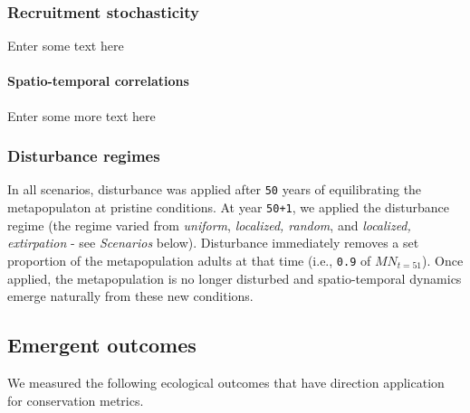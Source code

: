 \documentclass[]{article}
\let\oldparagraph\paragraph
\renewcommand{\paragraph}[1]{\oldparagraph{#1}\mbox{}}
\begin{document}
\hypertarget{recruitment-stochasticity}{%
\subsubsection{Recruitment
stochasticity}\label{recruitment-stochasticity}}

Enter some text here

\hypertarget{spatio-temporal-correlations}{%
\paragraph{Spatio-temporal
correlations}\label{spatio-temporal-correlations}}

Enter some more text here

\hypertarget{disturbance-regimes}{%
\subsubsection{Disturbance regimes}\label{disturbance-regimes}}

In all scenarios, disturbance was applied after \texttt{50} years of
equilibrating the metapopulaton at pristine conditions. At year
\texttt{50+1}, we applied the disturbance regime (the regime varied from
\emph{uniform}, \emph{localized, random}, and \emph{localized,
extirpation} - see \emph{Scenarios} below). Disturbance immediately
removes a set proportion of the metapopulation adults at that time
(i.e., \texttt{0.9} of \(MN_{t=51}\)). Once applied, the metapopulation
is no longer disturbed and spatio-temporal dynamics emerge naturally
from these new conditions.

\hypertarget{emergent-outcomes}{%
\subsection{Emergent outcomes}\label{emergent-outcomes}}

We measured the following ecological outcomes that have direction
application for conservation metrics.
\end{document}
